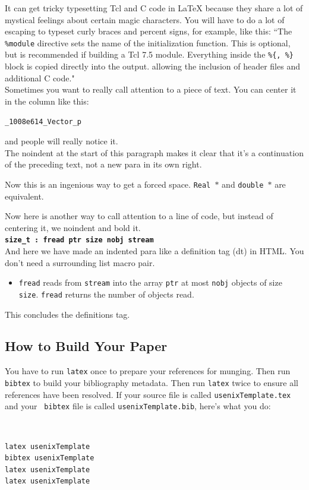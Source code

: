\documentclass[letterpaper,twocolumn,10pt]{article}
\begin{document}
It can get tricky typesetting Tcl and C code in LaTeX because they share
a lot of mystical feelings about certain magic characters.  You
will have to do a lot of escaping to typeset curly braces and percent
signs, for example, like this:
``The {\tt \%module} directive
sets the name of the initialization function.  This is optional, but is
recommended if building a Tcl 7.5 module.
Everything inside the {\tt \%\{, \%\}}
block is copied directly into the output. allowing the inclusion of
header files and additional C code." \\

Sometimes you want to really call attention to a piece of text.  You
can center it in the column like this:
\begin{center}
{\tt \_1008e614\_Vector\_p}
\end{center}
and people will really notice it.\\

\noindent
The noindent at the start of this paragraph makes it clear that it's
a continuation of the preceding text, not a new para in its own right.


Now this is an ingenious way to get a forced space.
{\tt Real~$*$} and {\tt double~$*$} are equivalent. 

Now here is another way to call attention to a line of code, but instead
of centering it, we noindent and bold it.\\

\noindent
{\bf \tt size\_t : fread ptr size nobj stream } \\

And here we have made an indented para like a definition tag (dt)
in HTML.  You don't need a surrounding list macro pair.
\begin{itemize}
\item[]  {\tt fread} reads from {\tt stream} into the array {\tt ptr} at
most {\tt nobj} objects of size {\tt size}.   {\tt fread} returns
the number of objects read. 
\end{itemize}
This concludes the definitions tag.

\subsection{How to Build Your Paper}

You have to run {\tt latex} once to prepare your references for
munging.  Then run {\tt bibtex} to build your bibliography metadata.
Then run {\tt latex} twice to ensure all references have been resolved.
If your source file is called {\tt usenixTemplate.tex} and your {\tt
  bibtex} file is called {\tt usenixTemplate.bib}, here's what you do:
{\tt \small
\begin{verbatim}
latex usenixTemplate
bibtex usenixTemplate
latex usenixTemplate
latex usenixTemplate
\end{verbatim}
}
\end{document}
